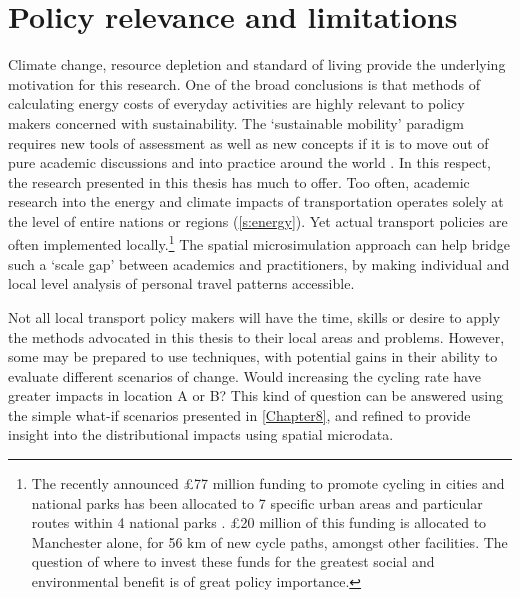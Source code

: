 \section{Policy relevance and limitations} \label{sprel}
Climate change, resource depletion and standard of living provide the underlying
motivation for this research. One of the broad conclusions is that
methods of calculating energy costs of everyday activities are
highly relevant to policy makers concerned with sustainability. The
`sustainable mobility' paradigm requires new tools of assessment
as well as new concepts if it is to move out of pure academic discussions and
into practice around the world \citep{Banister2008}. In this respect, the
research presented in this thesis has much to offer. Too often, academic
research into the energy and climate impacts of transportation operates solely
at the level of entire nations or regions (\cref{s:energy}). Yet actual
transport
policies are often implemented locally.\footnote{The recently announced
\pounds77 million funding to promote cycling in cities and
national parks has been allocated to 7 specific urban areas and particular
routes within 4 national parks
\citep{RimeMinister'sOfficea}. \pounds 20 million of this funding is
allocated to Manchester alone, for 56 km of new cycle paths, amongst other
facilities. The question of where to invest these funds for the greatest social
and environmental benefit is of great policy importance.
}
The spatial microsimulation approach can help bridge such a `scale gap'
between academics and practitioners, by making individual and local level
analysis of personal travel patterns accessible.

Not all local transport policy makers will have the time, skills or
desire to apply the methods advocated in this thesis to their local areas
and problems. However, some may be prepared to use techniques, with potential gains
in their ability to evaluate different scenarios of change. Would
increasing the cycling rate have greater impacts in location A or B? This kind
of question can be answered using the simple what-if scenarios presented in
\cref{Chapter8}, and refined to provide insight into the distributional impacts
using spatial microdata.

